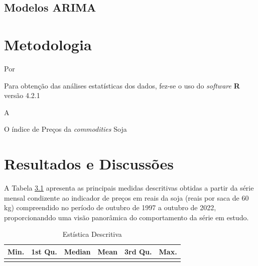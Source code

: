 \documentclass[
	12pt,				%
	openright,			%
	oneside,      %
	a4paper,			%
	english,			%
	french,				%
	spanish,			%
	brazil,				%
	]{abntex2}\usepackage[]{graphicx}\usepackage[table]{xcolor}
\newenvironment{knitrout}{}{} %
\theoremstyle{definition}
\theoremstyle{remark}
\begin{document}
  
  
  
  
  \section{Modelos ARIMA}





\chapter{Metodologia}

Por 


Para obtenção das análises estatísticas dos dados, fez-se o uso do \textit{software} \textbf{R} versão 4.2.1


A 


O índice de Preços da \textit{commodities} Soja 



\chapter{Resultados e Discussões}




A Tabela \ref{tab1} apresenta as principais medidas descritivas obtidas a partir da série mensal 
condizente ao indicador de preços em reais da soja (reais por saca de 60 kg) compreendido 
no período de outubro de 1997 a outubro de 2022, proporcionanddo uma visão panorâmica do comportamento da série em estudo. 

\begin{knitrout}
\color{fgcolor}\begin{table}[!h]

\caption{\label{tab:script3}Estística Descritiva \label{tab1}}
\centering
\begin{tabular}[t]{rrrrrr}
\toprule
Min. & 1st Qu. & Median & Mean & 3rd Qu. & Max.\\
\midrule
\cellcolor{gray!6}{13.87} & \cellcolor{gray!6}{31.34} & \cellcolor{gray!6}{46.8} & \cellcolor{gray!6}{58.63} & \cellcolor{gray!6}{72.91} & \cellcolor{gray!6}{195.8}\\
\bottomrule
\end{tabular}
\end{table}

\end{knitrout}
\end{document}
